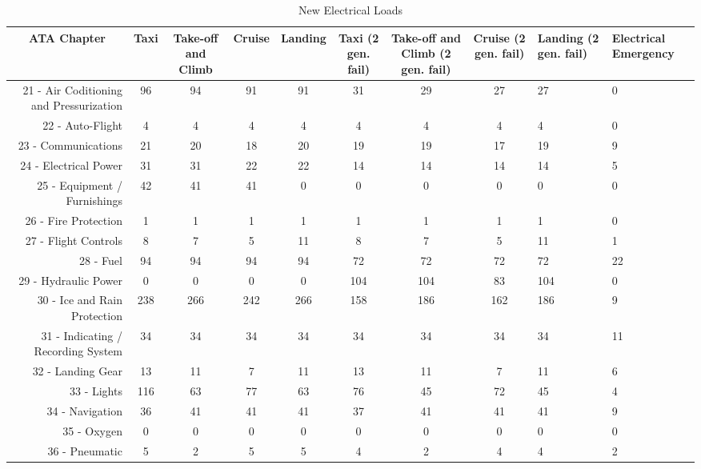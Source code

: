 \begin{table}[htbp]
  \centering
  \scriptsize
  \caption{New Electrical Loads}
    \begin{tabular}{rcccccccp{2cm}p{2cm}}
    \toprule
    \multicolumn{1}{c}{ATA Chapter} & Taxi  & Take-off and Climb & Cruise & Landing & Taxi (2 gen. fail) & Take-off and Climb (2 gen. fail) & Cruise  (2 gen. fail) & Landing  (2 gen. fail) & Electrical Emergency \\
    \midrule
    21 - Air Coditioning and Pressurization & 96    & 94    & 91    & 91    & 31    & 29    & 27    & 27    & 0 \\
    22 - Auto-Flight & 4     & 4     & 4     & 4     & 4     & 4     & 4     & 4     & 0 \\
    23 - Communications & 21    & 20    & 18    & 20    & 19    & 19    & 17    & 19    & 9 \\
    24 - Electrical Power & 31    & 31    & 22    & 22    & 14    & 14    & 14    & 14    & 5 \\
    25 - Equipment / Furnishings & 42    & 41    & 41    & 0     & 0     & 0     & 0     & 0     & 0 \\
    26 - Fire Protection & 1     & 1     & 1     & 1     & 1     & 1     & 1     & 1     & 0 \\
    27 - Flight Controls & 8     & 7     & 5     & 11    & 8     & 7     & 5     & 11    & 1 \\
    28 - Fuel & 94    & 94    & 94    & 94    & 72    & 72    & 72    & 72    & 22 \\
    29 - Hydraulic Power & 0     & 0     & 0     & 0     & 104   & 104   & 83    & 104   & 0 \\
    30 - Ice and Rain Protection & 238   & 266   & 242   & 266   & 158   & 186   & 162   & 186   & 9 \\
    31 - Indicating / Recording System & 34    & 34    & 34    & 34    & 34    & 34    & 34    & 34    & 11 \\
    32 - Landing Gear & 13    & 11    & 7     & 11    & 13    & 11    & 7     & 11    & 6 \\
    33 - Lights & 116   & 63    & 77    & 63    & 76    & 45    & 72    & 45    & 4 \\
    34 - Navigation & 36    & 41    & 41    & 41    & 37    & 41    & 41    & 41    & 9 \\
    35 - Oxygen & 0     & 0     & 0     & 0     & 0     & 0     & 0     & 0     & 0 \\
    36 - Pneumatic & 5     & 2     & 5     & 5     & 4     & 2     & 4     & 4     & 2 \\

\end{tabular}
\end{table}
